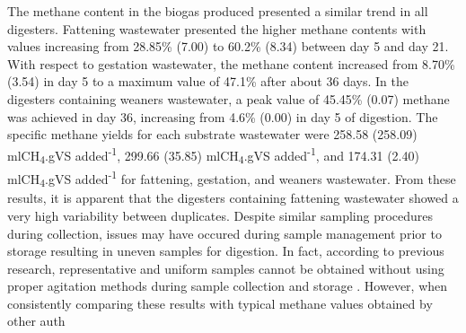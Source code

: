 The methane content in the biogas produced presented a similar trend in all digesters. Fattening wastewater presented the higher methane contents with values increasing from 28.85\% (7.00) to 60.2\% (8.34) between day 5 and day 21. With respect to gestation wastewater, the methane content increased from 8.70\% (3.54) in day 5 to a maximum value of 47.1\% after about 36 days. In the digesters containing weaners wastewater, a peak value of 45.45\% (0.07) methane was achieved in day 36, increasing from 4.6\% (0.00) in day 5 of digestion. The specific methane yields for each substrate wastewater were 258.58 (258.09) mlCH\textsubscript{4}.gVS added\textsuperscript{-1}, 299.66 (35.85) mlCH\textsubscript{4}.gVS added\textsuperscript{-1}, and 174.31 (2.40) mlCH\textsubscript{4}.gVS added\textsuperscript{-1} for fattening, gestation, and weaners wastewater. From these results, it is apparent that the digesters containing fattening wastewater showed a very high variability between duplicates. Despite similar sampling procedures during collection, issues may have occured during sample management prior to storage resulting in uneven samples for digestion. In fact,  according to previous research, representative and uniform samples cannot be obtained without using proper agitation methods during sample collection and storage \cite{Zhu_2004}. However, when consistently comparing these results with typical methane values obtained by other auth